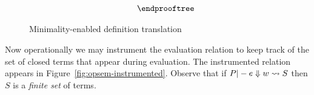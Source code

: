 \begin{figure}
\[\begin{array}{c}
{\begin{array}{l}
{\begin{array}{l}
\begin{array}{ll}
                   \end{array}
     \end{array}}
  \end{array}}
\endprooftree
\end{array}\]
\caption{Minimality-enabled definition translation}\label{fig:min-def-trans}
\end{figure}


Now operationally we may instrument the evaluation relation to keep track of the set of
closed terms that appear during evaluation. The instrumented relation appears in
Figure~\ref{fig:opsem-instrumented}. Observe that if $P |- e \Downarrow w \rightsquigarrow S$ then
$S$ is a {\em finite set} of terms.


